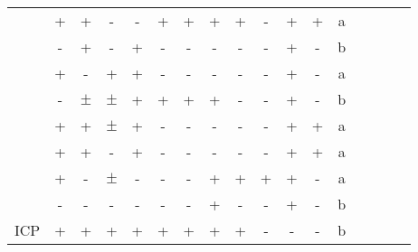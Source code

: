\documentclass[twoside,11pt]{article}
\begin{document}
\begin{table}
\begin{tabular}{lcccccccccccccccc}
  \citep{IOD2011}                         & +     &     + & -     & - & + & + & +     & + & - & + & +     & a \\%
  \citep{GIES2012}                        & -     &     + & -     & + & - & - & -     & - & - & + & -     & b \\%
  \citep{Hyttinen++2012}                  & +     &     - & +     & + & - & - & -     & - & - & + & -     & a \\%
  \citep{MooijHeskes_UAI_13}              & -     & $\pm$ & $\pm$ & + & + & + & +     & - & - & + & -     & b \\%
  \citep{HEJ2014}                         & +     &     + & $\pm$ & + & - & - & -     & - & - & + & +     & a \\%
  \citep{triantafillou2015constraint}     & +     &     + & -     & + & - & - & -     & - & - & + & +     & a \\%
  \citep{Rothenhausler++2015}             & +     &     - & $\pm$ & - & - & - & +     & + & + & + & -     & a \\%
  \citep{oates2016estimating}             & -     &     - & -     & - & - & - & +     & - & - & + & -     & b \\%
  ICP \citep{ICP2016}                     & +     &     + & +     & + & + & + & +     & + & - & - & -     & b \\%

\end{tabular}
\end{table}
\end{document}
